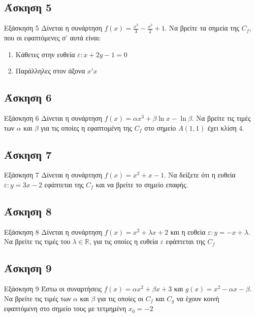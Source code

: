 \documentclass[greek]{beamer}
\begin{document}
\subsection{Άσκηση 5}
\begin{frame}[label=Άσκηση5]{Εξάσκηση 5}
 Δίνεται η συνάρτηση $f(x)=\frac{x^3}{3}-\frac{x^2}{2}+1$. Να βρείτε τα σημεία της $C_f$, που οι εφαπτόμενες σ' αυτά είναι:
 \begin{enumerate}
  \item<1-> Κάθετες στην ευθεία $ε:x+2y-1=0$
  \item<2-> Παράλληλες στον άξονα $x'x$
 \end{enumerate}

\end{frame}

\subsection{Άσκηση 6}
\begin{frame}[label=Άσκηση6]{Εξάσκηση 6}
 Δίνεται η συνάρτηση $f(x)=αx^3+β\ln x-\ln β$. Να βρείτε τις τιμές των $α$ και $β$ για τις οποίες η εφαπτομένη της $C_f$ στο σημείο $Α(1,1)$ έχει κλίση $4$.

\end{frame}

\subsection{Άσκηση 7}
\begin{frame}[label=Άσκηση7]{Εξάσκηση 7}
 Δίνεται η συνάρτηση $f(x)=x^2+x-1$. Να δείξετε ότι η ευθεία $ε:y=3x-2$ εφάπτεται της $C_f$ και να βρείτε το σημείο επαφής.

\end{frame}

\subsection{Άσκηση 8}
\begin{frame}[label=Άσκηση8]{Εξάσκηση 8}
 Δίνεται η συνάρτηση $f(x)=x^2+λx+2$ και η ευθεία $ε:y=-x+λ$. Να βρείτε τις τιμές του $λ\in\mathbb{R}$, για τις οποίες η ευθεία $ε$ εφάπτεται της $C_f$

\end{frame}

\subsection{Άσκηση 9}
\begin{frame}[label=Άσκηση9]{Εξάσκηση 9}
 Έστω οι συναρτήσεις $f(x)=αx^2+βx+3$ και $g(x)=x^2-αx-β$. Να βρείτε τις τιμές των $α$ και $β$ για τις οποίες οι $C_f$ και $C_g$ να έχουν κοινή εφαπτόμενη στο σημείο τους με τετμημένη $x_0=-2$

\end{frame}
\end{document}
